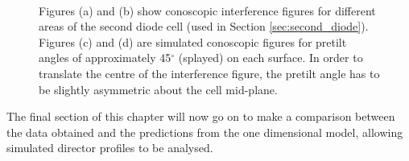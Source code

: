 \begin{figure}
\begin{center}
\\
\end{center}
\caption[Comparison between experimental and simulated splayed conoscopic figures]{\label{fig:diode_director}Figures (a) and (b) show conoscopic interference figures for different areas of the second diode cell (used in Section \ref{sec:second_diode}). Figures (c) and (d) are simulated conoscopic figures for pretilt angles of approximately 45$^{\circ}$ (splayed) on each surface. In order to translate the centre of the interference figure, the pretilt angle has to be slightly asymmetric about the cell mid-plane.}
\end{figure}

The final section of this chapter will now go on to make a comparison between the data obtained and the predictions from the one dimensional model, allowing simulated director profiles to be analysed.

